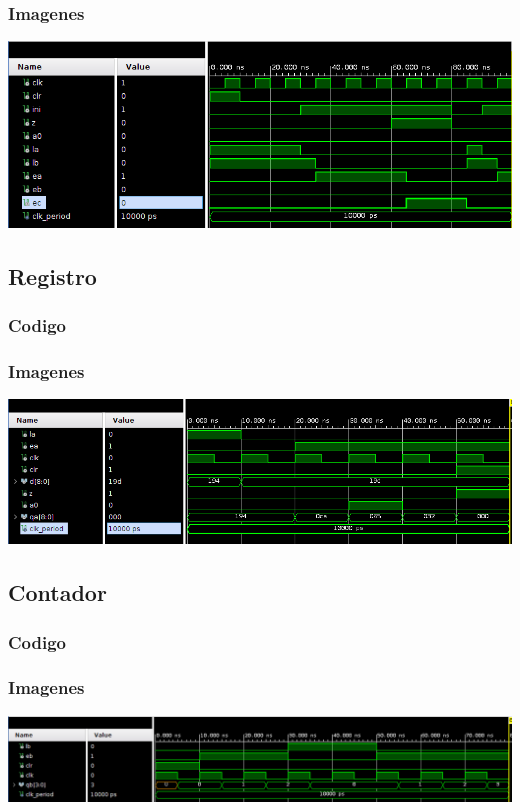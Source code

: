 \documentclass[8pt,executivepaper]{article}
\begin{document}
\subsubsection{Imagenes}
\begin{center}
  \includegraphics[scale=0.33]{img/unidadControl.png}
\end{center}

\subsection{Registro}
\subsubsection{Codigo}

\subsubsection{Imagenes}
\begin{center}
  \includegraphics[scale=0.33]{img/registro.png}
\end{center}

\subsection{Contador}
\subsubsection{Codigo}

\subsubsection{Imagenes}
\begin{center}
  \includegraphics[scale=0.33]{img/contador.png}
\end{center}
\end{document}
